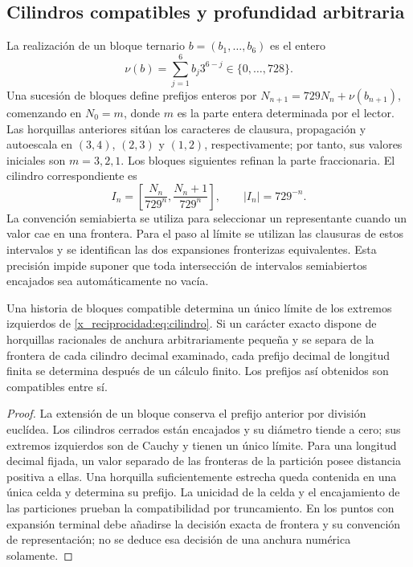 

\subsection{Cilindros compatibles y profundidad arbitraria}

La realización de un bloque ternario \(b=(b_1,\ldots,b_6)\) es el entero
\[
 \nu(b)=\sum_{j=1}^6b_j3^{6-j}\in\{0,\ldots,728\}.
\]
Una sucesión de bloques define prefijos enteros por \(N_{n+1}=729N_n+\nu(b_{n+1})\), comenzando en \(N_0=m\), donde \(m\) es la parte entera determinada por el lector. Las horquillas anteriores sitúan los caracteres de clausura, propagación y autoescala en \((3,4)\), \((2,3)\) y \((1,2)\), respectivamente; por tanto, sus valores iniciales son \(m=3,2,1\). Los bloques siguientes refinan la parte fraccionaria. El cilindro correspondiente es
\begin{equation}
 I_n=\left[\frac{N_n}{729^n},\frac{N_n+1}{729^n}\right],
 \qquad |I_n|=729^{-n}.
 \label{x_reciprocidad:eq:cilindro}
\end{equation}
La convención semiabierta se utiliza para seleccionar un representante cuando un valor cae en una frontera. Para el paso al límite se utilizan las clausuras de estos intervalos y se identifican las dos expansiones fronterizas equivalentes. Esta precisión impide suponer que toda intersección de intervalos semiabiertos encajados sea automáticamente no vacía.

\begin{theorem}
Una historia de bloques compatible determina un único límite de los extremos izquierdos de \eqref{x_reciprocidad:eq:cilindro}. Si un carácter exacto dispone de horquillas racionales de anchura arbitrariamente pequeña y se separa de la frontera de cada cilindro decimal examinado, cada prefijo decimal de longitud finita se determina después de un cálculo finito. Los prefijos así obtenidos son compatibles entre sí.
\end{theorem}
\begin{proof}
La extensión de un bloque conserva el prefijo anterior por división euclídea. Los cilindros cerrados están encajados y su diámetro tiende a cero; sus extremos izquierdos son de Cauchy y tienen un único límite. Para una longitud decimal fijada, un valor separado de las fronteras de la partición posee distancia positiva a ellas. Una horquilla suficientemente estrecha queda contenida en una única celda y determina su prefijo. La unicidad de la celda y el encajamiento de las particiones prueban la compatibilidad por truncamiento. En los puntos con expansión terminal debe añadirse la decisión exacta de frontera y su convención de representación; no se deduce esa decisión de una anchura numérica solamente.
\end{proof}


